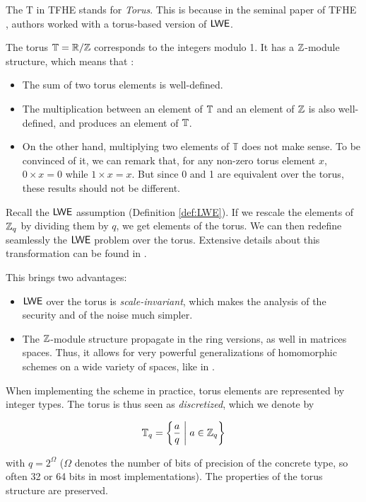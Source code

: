 The T in TFHE stands for \textit{Torus}. This is because in the seminal paper of TFHE \cite{JC:CGGI23}, authors worked with a torus-based version of $\textsf{LWE}$.


The torus $\mathbb{T} = \mathbb{R} / \mathbb{Z}$ corresponds to the integers modulo 1. It has a $\mathbb{Z}$-module structure, which means that :

\begin{itemize}
	\item The sum of two torus elements is well-defined.
	\item The multiplication between an element of $\mathbb{T}$ and an element of $\mathbb{Z}$ is also well-defined, and produces an element of $\mathbb{T}$.
	\item On the other hand, multiplying two elements of $\mathbb T$ does not make sense. To be convinced of it, we can remark that, for any non-zero torus element $x$, $0 \times x = 0$ while $1 \times x = x$. But since 0 and 1 are equivalent over the torus, these results should not be different. 
\end{itemize}



Recall the $\textsf{LWE}$ assumption (Definition \ref{def:LWE}). If we rescale the elements of $\mathbb{Z}_q$ by dividing them by $q$, we get elements of the torus. We can then redefine seamlessly the $\textsf{LWE}$ problem over the torus. Extensive details about this transformation can be found in \cite{these_chillotti}.


This brings two advantages:

\begin{itemize}
	\item $\textsf{LWE}$ over the torus is \textit{scale-invariant}, which makes the analysis of the security and of the noise much simpler.
	\item The $\mathbb{Z}$-module structure propagate in the ring versions, as well in matrices spaces. Thus, it allows for very powerful generalizations of homomorphic schemes on a wide variety of spaces, like in \cite{chimera, asiacrypt}.
\end{itemize} 


When implementing the scheme in practice, torus elements are represented by integer types. The torus is thus seen as \textit{discretized}, which we denote by 

\[ \mathbb{T}_q = \left \{   \frac a q \;\middle|\; a \in \mathbb{Z}_q  \right \} \] 

with $q = 2^\Omega$ ($\Omega$ denotes the number of bits of precision of the concrete type, so often 32 or 64 bits in most implementations). The properties of the torus structure are preserved.


